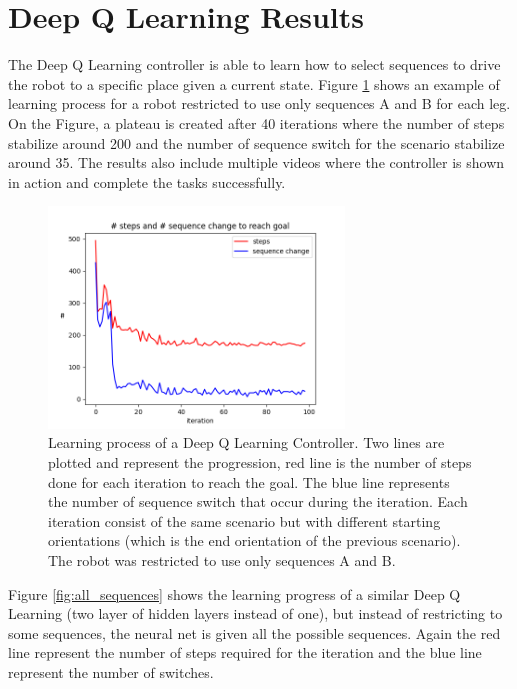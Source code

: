     \section{Deep Q Learning Results}\label{sec:res_qlearning}
        The Deep Q Learning controller is able to learn how to select sequences to drive the robot to a specific place given a current state. Figure \ref{fig:dqn_results} shows an example of learning process for a robot restricted to use only sequences A and B for each leg. On the Figure, a plateau is created after 40 iterations where the number of steps stabilize around 200 and the number of sequence switch for the scenario stabilize around 35. The results also include multiple videos where the controller is shown in action and complete the tasks successfully.
        \begin{figure}[h]
            \centering
            \includegraphics[width=0.7\textwidth]{images/AB-0-FALSE.png}
            \caption{Learning process of a Deep Q Learning Controller. Two lines are plotted and represent the progression, red line is the number of steps done for each iteration to reach the goal. The blue line represents the number of sequence switch that occur during the iteration. Each iteration consist of the same scenario but with different starting orientations (which is the end orientation of the previous scenario). The robot was restricted to use only sequences A and B.}
            \label{fig:dqn_results}
        \end{figure}
        
        Figure \ref{fig:all_sequences} shows the learning progress of a similar Deep Q Learning (two layer of hidden layers instead of one), but instead of restricting to some sequences, the neural net is given all the possible sequences. Again the red line represent the number of steps required for the iteration and the blue line represent the number of switches.
        
